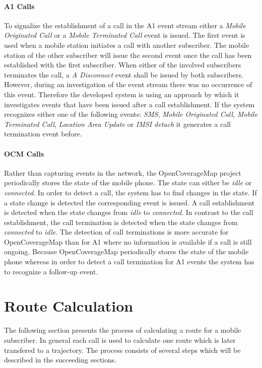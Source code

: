 \documentclass[master,english]{hgbthesis}
\begin{document}
\paragraph{A1 Calls}
To signalize the establishment of a call in the A1 event stream either a \emph{Mobile Originated Call} or a \emph{Mobile Terminated Call} event is issued. The first event is used when a mobile station initiates a call with another subscriber. The mobile station of the other subscriber will issue the second event once the call has been established with the first subscriber.
When either of the involved subscribers terminates the call, a \emph{A Disconnect} event shall be issued by both subscribers. However, during an investigation of the event stream there was no occurrence of this event. Therefore the developed system is using an approach by which it investigates events that have been issued after a call establishment. If the system recognizes either one of the following events: \emph{SMS}, \emph{Mobile Originated Call}, \emph{Mobile Terminated Call}, \emph{Location Area Update} or \emph{IMSI detach} it generates a call termination event before.
\paragraph{OCM Calls}
Rather than capturing events in the network, the OpenCoverageMap project periodically stores the state of the mobile phone. The state can either be \emph{idle} or \emph{connected}. In order to detect a call, the system has to find changes in the state. If a state change is detected the corresponding event is issued. A call establishment is detected when the state changes from \emph{idle} to \emph{connected}. In contrast to the call establishment, the call termination is detected when the state changes from \emph{connected} to \emph{idle}.
The detection of call terminations is more accurate for OpenCoverageMap than for A1 where no information is available if a call is still ongoing. Because OpenCoverageMap periodically stores the state of the mobile phone whereas in order to detect a call termination for A1 events the system has to recognize a follow-up event.
\section{Route Calculation}
The following section presents the process of calculating a route for a mobile subscriber. In general each call is used to calculate one route which is later transfered to a trajectory. The process consists of several steps which will be described in the succeeding sections.
\end{document}
